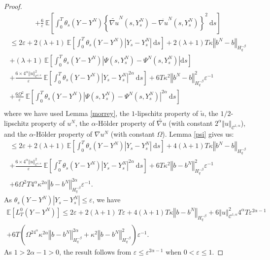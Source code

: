 \documentclass[11pt]{article}
\newcommand{\norme}[1]{\left\Vert #1\right\Vert}
\newcommand{\E}{\mathbb{E}}
\newcommand{\di}{\mathrm{d}}
\begin{document}
\begin{proof}
\begin{multline*}
    +\frac{6}{\varepsilon}\ \E\left[\int_{0}^T \theta_s\left(Y-Y^N\right)\left\{\widetilde{\nabla u}^N\left(s,Y_s^N\right)-{\overline{\nabla u}^N}\left(s,Y_s^N\right)\right\}^2\ \di s\right]
    \end{multline*}
    \begin{multline*}
    \leq 2\varepsilon + 2(\lambda + 1)\ \E\left[\int_0^T\theta_s\left(Y-Y^N\right)\left|Y_s - Y^N_s\right|\ \di s \right] + 2(\lambda + 1)T\kappa\norme{b^N-b}_{H^{-\beta}_{q}} \\
    + (\lambda + 1)\ \E\left[\int_{0}^T\theta_s\left(Y-Y^N\right)\left|\Psi\left(s,Y_s^N\right)-\Psi^N\left(s,Y_s^N\right)\right| \di s \right]\\  
    +\frac{6\times4^{\alpha}\norme{u}_{\mathcal{C}^{1,\alpha}}^2}{\varepsilon}\ \E\left[\int_0^T \theta_s\left(Y-Y^N\right)\left|Y_s - Y^N_s\right|^{2\alpha}\ \di s\right]  + 6T\kappa^2\norme{b^N-b}_{H^{-\beta}_{q}}^2\varepsilon^{-1} \\+\frac{6\Omega^2}{\varepsilon}\ \E\left[\int_{0}^T \theta_s\left(Y-Y^N\right)\left|\Psi\left(s,Y_s^N\right)-{\Psi^N}\left(s,Y_s^N\right)\right|^{2\alpha}\ \di s\right]\\
    \end{multline*}
    where we have used Lemma \ref{morrey}, the $1$-lipschitz property of $\widetilde{u}$, the $1/2$-lipschitz property of $u^N$, the $\alpha$-Hölder property of $\widetilde{\nabla u}$ (with constant $2^\alpha\norme{u}_{\mathcal{C}^{1,\alpha}}$), and the $\alpha$-Hölder property of $\nabla u^N$ (with constant $\Omega$). Lemma \ref{psi} gives us:
    \begin{multline*}
    \leq 2\varepsilon + 2(\lambda + 1)\ \E\left[\int_0^T\theta_s\left(Y-Y^N\right)\left|Y_s - Y^N_s\right|\ \di s \right] + 4(\lambda + 1)T\kappa\norme{b^N-b}_{H^{-\beta}_{q}} \\  
    +\frac{6\times4^{\alpha}\norme{u}_{\mathcal{C}^{1,\alpha}}^2}{\varepsilon}\ \E\left[\int_0^T \theta_s\left(Y-Y^N\right)\left|Y_s - Y^N_s\right|^{2\alpha}\ \di s\right]+ 6T\kappa^2\norme{b-b^N}_{H^{-\beta}_{q}}^2\varepsilon^{-1}\\   + 6\Omega^2T4^{\alpha}\kappa^{2\alpha} \norme{b-b^N}_{H^{-\beta}_q}^{2\alpha}\varepsilon^{-1}.
    \end{multline*}
    As $\theta_s(Y-Y^N)\left|Y_s - Y^N_s\right|\leq \varepsilon$, we have    
    \begin{multline*}
    \E\left[L^0_T(Y-Y^N)\right]\leq 2\varepsilon + 2(\lambda + 1)\ T\varepsilon
    +4(\lambda + 1)T\kappa\norme{b-b^N}_{H^{-\beta}_{q}}+6\norme{u}_{\mathcal{C}^{1,\alpha}}^2 4^{\alpha}T \varepsilon^{2\alpha-1} \\ + 6T\left(\Omega^24^{\alpha}\kappa^{2\alpha} \norme{b-b^N}_{H^{-\beta}_q}^{2\alpha}+\kappa^2\norme{b-b^N}_{H^{-\beta}_{q}}^2\right)\varepsilon^{-1}.
    \end{multline*}    
    As $1>2\alpha-1>0$, the result follows from $\varepsilon\leq\varepsilon^{2\alpha-1}$ when $0<\varepsilon\leq1$.  
    
\end{proof}
\end{document}

